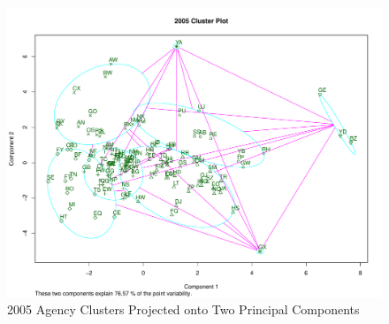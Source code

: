 \documentclass{article}
\begin{document}
    \begin{center}
        \begin{figure}
            \includegraphics[scale=0.4]{./images/2005-cluster-plot.pdf}
            \caption{2005 Agency Clusters Projected onto Two Principal Components}
            \label{fig:5}
        \end{figure}
    \end{center}
\end{document}
